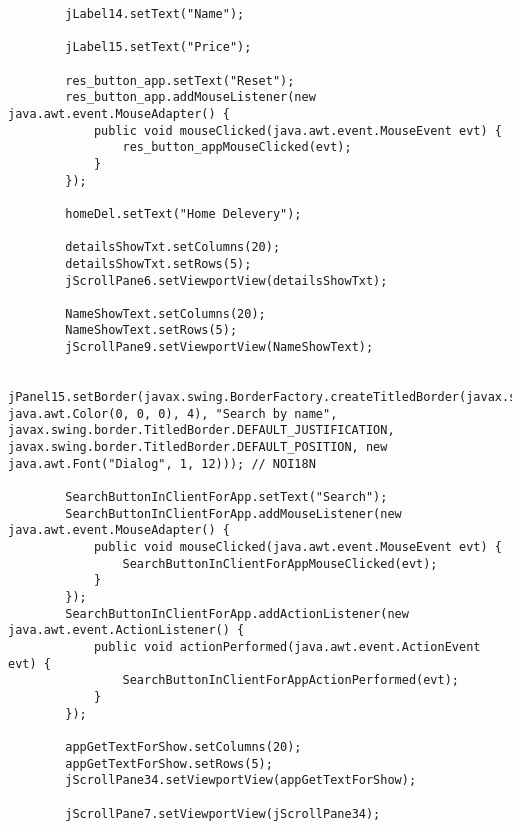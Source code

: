 \documentclass[12pt,a4paper]{article}
\begin{document}
\begin{lstlisting}
        jLabel14.setText("Name");

        jLabel15.setText("Price");

        res_button_app.setText("Reset");
        res_button_app.addMouseListener(new java.awt.event.MouseAdapter() {
            public void mouseClicked(java.awt.event.MouseEvent evt) {
                res_button_appMouseClicked(evt);
            }
        });

        homeDel.setText("Home Delevery");

        detailsShowTxt.setColumns(20);
        detailsShowTxt.setRows(5);
        jScrollPane6.setViewportView(detailsShowTxt);

        NameShowText.setColumns(20);
        NameShowText.setRows(5);
        jScrollPane9.setViewportView(NameShowText);

        jPanel15.setBorder(javax.swing.BorderFactory.createTitledBorder(javax.swing.BorderFactory.createLineBorder(new java.awt.Color(0, 0, 0), 4), "Search by name", javax.swing.border.TitledBorder.DEFAULT_JUSTIFICATION, javax.swing.border.TitledBorder.DEFAULT_POSITION, new java.awt.Font("Dialog", 1, 12))); // NOI18N

        SearchButtonInClientForApp.setText("Search");
        SearchButtonInClientForApp.addMouseListener(new java.awt.event.MouseAdapter() {
            public void mouseClicked(java.awt.event.MouseEvent evt) {
                SearchButtonInClientForAppMouseClicked(evt);
            }
        });
        SearchButtonInClientForApp.addActionListener(new java.awt.event.ActionListener() {
            public void actionPerformed(java.awt.event.ActionEvent evt) {
                SearchButtonInClientForAppActionPerformed(evt);
            }
        });

        appGetTextForShow.setColumns(20);
        appGetTextForShow.setRows(5);
        jScrollPane34.setViewportView(appGetTextForShow);

        jScrollPane7.setViewportView(jScrollPane34);


\end{lstlisting}
\end{document}
